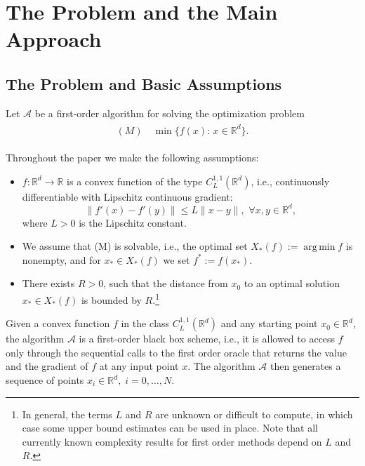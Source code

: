 \documentclass[12pt]{article}
\numberwithin{equation}{section}
\theoremstyle{definition}
\theoremstyle{remark}
\DeclareMathOperator*{\Argmin}{arg\,min}
\def\real{\mathbb{R}}
\begin{document}
\section{The Problem and the Main Approach}\label{S:mainapproach}

\subsection{The Problem and Basic Assumptions}

Let $\mathcal{A}$ be a first-order algorithm for solving the optimization problem
\begin{align*}
    \begin{aligned}
    (M)\quad \min\{ f(x):\, x \in \real^d\}.
    \end{aligned}
\end{align*}

Throughout the paper we make the following assumptions:
\begin{itemize}
\item $f:\real^d \to \real$  is a convex function of the type $C^{1,1}_L(\real^d)$, i.e.,
continuously differentiable with Lipschitz continuous gradient:
\[
    \|f'(x)-f'(y)\|\leq L \|x-y\|,\,\,\forall x,y\in \real^d,
\]
where $L>0$ is the Lipschitz constant.
\item We assume that (M) is solvable, i.e., the optimal set $X_*(f):=\Argmin f$ is nonempty, and for
$x_*\in X_*(f)$ we set $f^*:=f(x_*).$
\item There exists $R>0$, such that
the distance from $x_0$ to an optimal solution $x_\ast\in X_*(f)$ is bounded by
$R$.\footnote{In general, the terms $L$ and $R$ are unknown or difficult to compute, in which case
some upper bound estimates can be used in place. Note that all currently known complexity
results for first order methods depend on $L$ and $R$.}
\end{itemize}


Given a convex function $f$ in the class $C^{1,1}_L(\real^d)$ and any starting point $x_0 \in
\real^d$, the algorithm $\mathcal{A}$ is a first-order black box scheme, i.e., it is allowed
to access $f$ only through the sequential calls to the first order oracle that returns the
value and the gradient of $f$ at  any input point $x$.   The algorithm  $\mathcal{A}$ then
generates a sequence of points %
$x_i \in \real^d, \;i=0,\ldots, N$.
\end{document}
